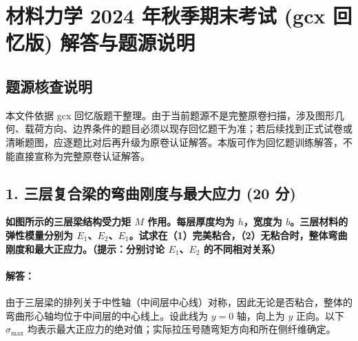 \documentclass[11pt,a4paper]{ctexrep}
\begin{document}
\chapter{材料力学 2024 年秋季期末考试 (gcx 回忆版) 解答与题源说明}
{



\section*{题源核查说明}

本文件依据 gcx 回忆版题干整理。由于当前题源不是完整原卷扫描，涉及图形几何、载荷方向、边界条件的题目必须以现存回忆题干为准；若后续找到正式试卷或清晰题图，应逐题比对后再升级为原卷认证解答。本版可作为回忆题训练解答，不能直接宣称为完整原卷认证解答。

\section*{1. 三层复合梁的弯曲刚度与最大应力 (20 分)}

\textbf{如图所示的三层梁结构受力矩 $M$ 作用。每层厚度均为 $h$，宽度为 $b$。三层材料的弹性模量分别为 $E_1$、$E_2$、$E_1$。试求在（1）完美粘合，（2）无粘合时，整体弯曲刚度和最大正应力。（提示：分别讨论 $E_1$、$E_2$ 的不同相对关系）}

\subsubsection*{解答：}

由于三层梁的排列关于中性轴（中间层中心线）对称，因此无论是否粘合，整体的弯曲形心轴均位于中间层的中心线上。设此线为 $y = 0$ 轴，向上为 $y$ 正向。以下 $\sigma_{\max}$ 均表示最大正应力的绝对值；实际拉压号随弯矩方向和所在侧纤维确定。

}
\end{document}
